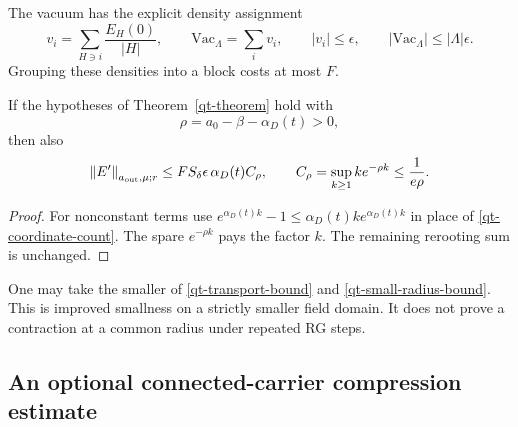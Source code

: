 The vacuum has the explicit density assignment
\begin{equation}\label{qt-vacuum-density}
 v_i=\sum_{H\ni i}\frac{E_H(0)}{|H|},\qquad
 \mathrm{Vac}_\Lambda=\sum_i v_i,
 \qquad |v_i|\le\epsilon,
 \qquad |\mathrm{Vac}_\Lambda|\le|\Lambda|\epsilon.
\end{equation}
Grouping these densities into a block costs at most $F$.

\begin{corollary}\label{qt-small-radius}
If the hypotheses of Theorem~\ref{qt-theorem} hold with
\begin{equation}\label{qt-spare-reserve}
 \rho=a_0-\beta-\alpha_D(t)>0,
\end{equation}
then also
\begin{equation}\label{qt-small-radius-bound}
 \left\|E'\right\|_{a_{\mathrm{out}},\mu;r}
 \le F S_\delta\epsilon\,\alpha_D(t) C_\rho,
 \qquad C_\rho=\sup_{k\ge1}k e^{-\rho k}\le\frac1{e\rho}.
\end{equation}
\end{corollary}
\begin{proof}
For nonconstant terms use
$e^{\alpha_D(t)k}-1\le\alpha_D(t)k e^{\alpha_D(t)k}$
in place of \eqref{qt-coordinate-count}. The spare
$e^{-\rho k}$ pays the factor $k$. The remaining rerooting sum
is unchanged.
\end{proof}
One may take the smaller of \eqref{qt-transport-bound} and
\eqref{qt-small-radius-bound}. This is improved smallness on a
strictly smaller field domain. It does not prove a contraction
at a common radius under repeated RG steps.

\subsection{An optional connected-carrier compression estimate}
\label{qt-compression-section}

